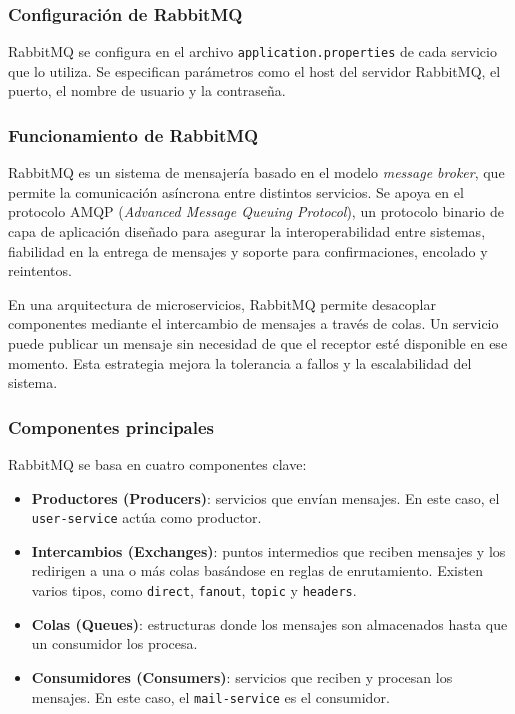\subsubsection{Configuración de RabbitMQ}
RabbitMQ se configura en el archivo \texttt{application.properties} de cada servicio que lo utiliza. Se especifican parámetros como el host del servidor RabbitMQ, el puerto, el nombre de usuario y la contraseña.
\subsubsection{Funcionamiento de RabbitMQ}

RabbitMQ es un sistema de mensajería basado en el modelo \textit{message broker}, que permite la comunicación asíncrona entre distintos servicios. Se apoya en el protocolo AMQP (\textit{Advanced Message Queuing Protocol}), un protocolo binario de capa de aplicación diseñado para asegurar la interoperabilidad entre sistemas, fiabilidad en la entrega de mensajes y soporte para confirmaciones, encolado y reintentos.

En una arquitectura de microservicios, RabbitMQ permite desacoplar componentes mediante el intercambio de mensajes a través de colas. Un servicio puede publicar un mensaje sin necesidad de que el receptor esté disponible en ese momento. Esta estrategia mejora la tolerancia a fallos y la escalabilidad del sistema.

\subsubsection{Componentes principales}

RabbitMQ se basa en cuatro componentes clave:

\begin{itemize}
  \item \textbf{Productores (Producers)}: servicios que envían mensajes. En este caso, el \texttt{user-service} actúa como productor.
  \item \textbf{Intercambios (Exchanges)}: puntos intermedios que reciben mensajes y los redirigen a una o más colas basándose en reglas de enrutamiento. Existen varios tipos, como \texttt{direct}, \texttt{fanout}, \texttt{topic} y \texttt{headers}.
  \item \textbf{Colas (Queues)}: estructuras donde los mensajes son almacenados hasta que un consumidor los procesa.
  \item \textbf{Consumidores (Consumers)}: servicios que reciben y procesan los mensajes. En este caso, el \texttt{mail-service} es el consumidor.
\end{itemize}

